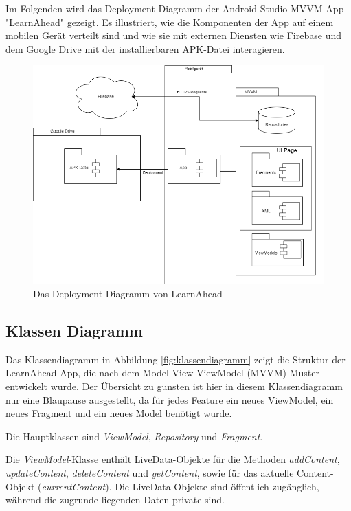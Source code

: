 \noindent
Im Folgenden wird das Deployment-Diagramm der Android Studio \ac{MVVM} App "LearnAhead" gezeigt. Es illustriert, wie die Komponenten der App auf einem mobilen Gerät verteilt sind und wie sie mit externen Diensten wie Firebase und dem Google Drive mit der installierbaren \ac{APK}-Datei interagieren.\newline
\begin{figure}[H]
    \centering
    \includegraphics[width=1\textwidth]{images/diagramme/DeploymentDiagramm.png}
    \caption{Das Deployment Diagramm von LearnAhead}
    \label{fig:DeploymentDiagramm}
\end{figure}

\subsection{Klassen Diagramm} \label{Klassen Diagramm}
Das Klassendiagramm in Abbildung \ref{fig:klassendiagramm} zeigt die Struktur der LearnAhead App, die nach dem Model-View-ViewModel (MVVM) Muster entwickelt wurde. Der Übersicht zu gunsten ist hier in diesem Klassendiagramm nur eine Blaupause ausgestellt, da für jedes Feature ein neues ViewModel, ein neues Fragment und ein neues Model benötigt wurde.\newline

\noindent
Die Hauptklassen sind \textit{ViewModel}, \textit{Repository} und \textit{Fragment}. \newline

\noindent
Die \textit{ViewModel}-Klasse enthält LiveData-Objekte für die Methoden \textit{addContent}, \textit{updateContent}, \textit{deleteContent} und \textit{getContent}, sowie für das aktuelle Content-Objekt (\textit{currentContent}). Die LiveData-Objekte sind öffentlich zugänglich, während die zugrunde liegenden Daten private sind.\newline

